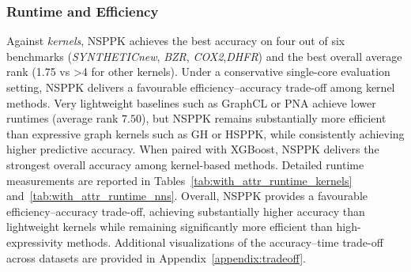 \subsubsection{Runtime and Efficiency}
\label{sec:runtime}


Against \emph{kernels}, NSPPK achieves the best accuracy on four out of six
benchmarks (\emph{SYNTHETICnew}, \emph{BZR}, \emph{COX2},\emph{DHFR}) and the best overall
average rank (1.75 vs >4 for other kernels).
Under a conservative single-core evaluation setting, NSPPK delivers a favourable
efficiency--accuracy trade-off among kernel methods. Very lightweight baselines
such as GraphCL or PNA achieve lower runtimes (average rank $7.50$), but NSPPK
remains substantially more efficient than expressive graph kernels such as GH or
HSPPK, while consistently achieving higher predictive accuracy. When paired with
XGBoost, NSPPK delivers the strongest overall accuracy among kernel-based
methods.
Detailed runtime measurements are reported in
Tables~\ref{tab:with_attr_runtime_kernels} and~\ref{tab:with_attr_runtime_nns}.
Overall, NSPPK provides a favourable efficiency--accuracy trade-off,
achieving substantially higher accuracy than lightweight kernels while
remaining significantly more efficient than high-expressivity methods.
Additional visualizations of the accuracy--time trade-off across datasets
are provided in Appendix~\ref{appendix:tradeoff}.



